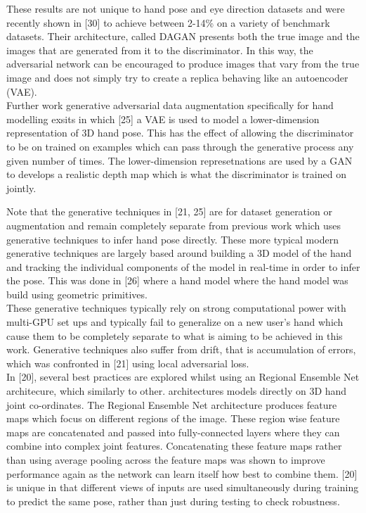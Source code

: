 \documentclass{article}
\begin{document}
These results are not unique to hand pose and eye direction datasets and were recently shown in [30] to achieve between 2-14\% on a variety of benchmark datasets. Their architecture, called DAGAN presents both the true image and the images that are generated from it to the discriminator. In this way, the adversarial network can be encouraged to produce images that vary from the true image and does not simply try to create a replica behaving like an autoencoder (VAE).\\

Further work generative adversarial data augmentation specifically for hand modelling exsits in which [25] a VAE is used to model a lower-dimension representation of 3D hand pose. This has the effect of allowing the discriminator to be on trained on examples which can pass through the generative process any given number of times. The lower-dimension represetnations are used by a GAN to develops a realistic depth map which is what the discriminator is trained on jointly. 

Note that the generative techniques in [21, 25] are for dataset generation or augmentation and remain completely separate from previous work which uses generative techniques to infer hand pose directly. These more typical modern generative techniques are largely based around building a 3D model of the hand and tracking the individual components of the model in real-time in order to infer the pose. This was done  in [26] where a hand model  where the hand model was build using geometric primitives.\\

These generative techniques typically rely on strong computational power with multi-GPU set ups and typically fail to generalize on a new user's hand which cause them to be completely separate to what is aiming to be achieved in this work. Generative techniques also suffer from drift, that is accumulation of errors, which was confronted in [21] using local adversarial loss.\\ 

In [20], several best practices are explored whilst using an Regional Ensemble Net architecure, which similarly to other. architectures models directly on 3D hand joint co-ordinates. The Regional Ensemble Net architecture produces feature maps which focus on different regions of the image. These region wise feature maps are concatenated and passed into fully-connected layers where they can combine into complex joint features. Concatenating these feature maps rather than using average pooling across the feature maps was shown to improve performance again as the network can learn itself how best to combine them. [20] is unique in that different views of inputs are used simultaneously during training to predict the same pose, rather than just during testing to check robustness. \\
\end{document}
